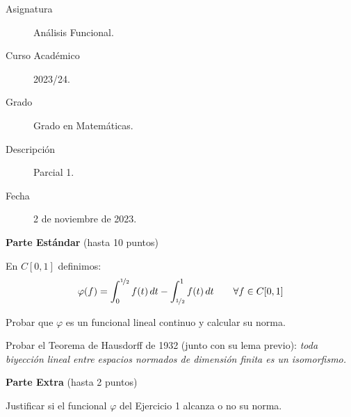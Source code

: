 \documentclass[12pt]{article}
\begin{document}

    
    

    \begin{description}
        \item[Asignatura] Análisis Funcional.
        \item[Curso Académico] 2023/24.
        \item[Grado] Grado en Matemáticas.
        \item[Descripción] Parcial 1.
        \item[Fecha] 2 de noviembre de 2023.
    
    \end{description}
    \newpage


    
    \textbf{Parte Estándar} (hasta 10 puntos)
    \begin{ejercicio}[5 puntos]
        En $C[0, 1]$ definimos:
        \begin{equation*}
            \varphi(f) = \int_0^{\nicefrac{1}{2}} f(t)\,dt - \int_{\nicefrac{1}{2}}^1 f(t)\,dt\qquad \forall f \in C[0, 1]
        \end{equation*}

        Probar que $\varphi$ es un funcional lineal continuo y calcular su norma.
    \end{ejercicio}

    \begin{ejercicio}[5 puntos]
        Probar el Teorema de Hausdorff de 1932 (junto con su lema previo): \textit{toda biyección lineal entre espacios normados de dimensión finita es un isomorfismo.}
    \end{ejercicio}

    \noindent
    \textbf{Parte Extra} (hasta 2 puntos)
    \begin{ejercicio}
        Justificar si el funcional $\varphi$ del Ejercicio 1 alcanza o no su norma.
    \end{ejercicio}
\end{document}
